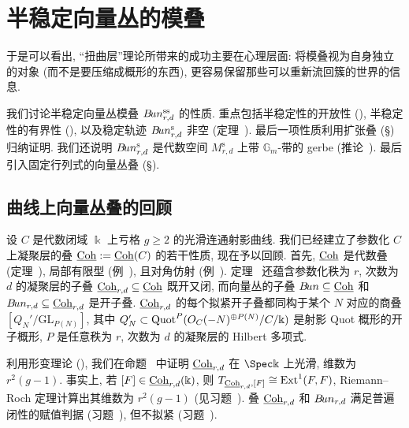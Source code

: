 \section{半稳定向量丛的模叠}\label{src:9.2}
\begin{epigraph}
于是可以看出, ``扭曲层''理论所带来的成功主要在心理层面: 将模叠视为自身独立的对象 (而不是要压缩成概形的东西), 更容易保留那些可以重新流回簇的世界的信息.
\end{epigraph}
我们讨论半稳定向量丛模叠 $B\!un_{r,d}^{\mathrm{ss}}$ 的性质. 重点包括半稳定性的开放性 (), 半稳定性的有界性 (), 以及稳定轨迹 $B\!un_{r,d}^{\mathrm s}$ 非空 (定理~). 最后一项性质利用扩张叠 (\S{}) 归纳证明. 我们还说明 $B\!un_{r,d}^{\mathrm s}$ 是代数空间 $M_{r,d}^{\mathrm s}$ 上带 $\mathbb G_m$-带的 gerbe (推论~). 最后引入固定行列式的向量丛叠 (\S{}).
\subsection{曲线上向量丛叠的回顾}\label{src:9.2.1-subsection}
设 $C$ 是代数闭域 $\Bbbk$ 上亏格 $g\geq2$ 的光滑连通射影曲线. 我们已经建立了参数化 $C$ 上凝聚层的叠 $\underline{\mathrm{Coh}}:=\underline{\mathrm{Coh}}(C)$ 的若干性质, 现在予以回顾. 首先, $\underline{\mathrm{Coh}}$ 是代数叠 (定理~), 局部有限型 (例~), 且对角仿射 (例~). 定理~ 还蕴含参数化秩为 $r$, 次数为 $d$ 的凝聚层的子叠 $\underline{\mathrm{Coh}}_{r,d}\subseteq\underline{\mathrm{Coh}}$ 既开又闭, 而向量丛的子叠 $B\!un\subseteq\underline{\mathrm{Coh}}$ 和 $B\!un_{r,d}\subseteq\underline{\mathrm{Coh}}_{r,d}$ 是开子叠. $\underline{\mathrm{Coh}}_{r,d}$ 的每个拟紧开子叠都同构于某个 $N$ 对应的商叠 $[Q_N'/\mathrm{GL}_{P(N)}]$, 其中 $Q_N'\subset\operatorname{Quot}^P(O_C(-N)^{\oplus P(N)}/C/\Bbbk)$ 是射影 Quot 概形的开子概形, $P$ 是任意秩为 $r$, 次数为 $d$ 的凝聚层的 Hilbert 多项式.

利用形变理论 (), 我们在命题~ 中证明 $\underline{\mathrm{Coh}}_{r,d}$ 在 $\Spec\Bbbk$ 上光滑, 维数为 $r^2(g-1)$. 事实上, 若 $[F]\in\underline{\mathrm{Coh}}_{r,d}(\Bbbk)$, 则 $T_{\underline{\mathrm{Coh}}_{r,d},[F]}\cong\operatorname{Ext}^1(F,F)$, Riemann--Roch 定理计算出其维数为 $r^2(g-1)$ (见习题~). 叠 $\underline{\mathrm{Coh}}_{r,d}$ 和 $B\!un_{r,d}$ 满足普遍闭性的赋值判据 (习题~), 但不拟紧 (习题~).


